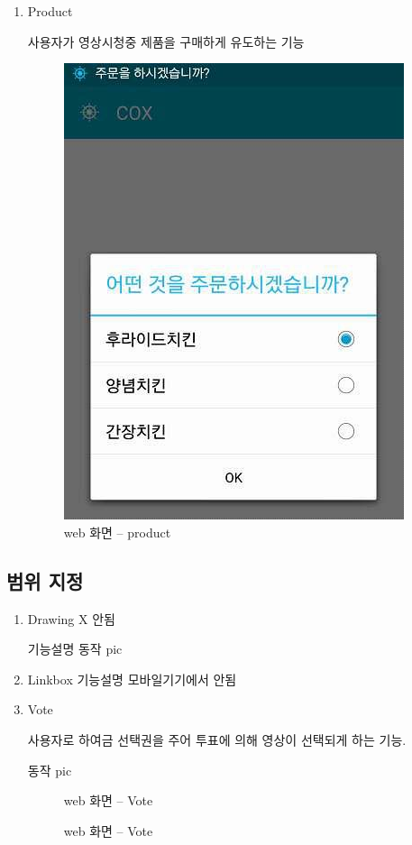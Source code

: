\documentclass[chapter,oneside]{oblivoir}
\begin{document}
\begin{enumerate}
    \item Product

    사용자가 영상시청중 제품을 구매하게 유도하는 기능 

    \begin{figure}[h!]
    \centering
    \includegraphics{pic/chp78/img1123}
    \caption{web 화면 – product}
    \end{figure} 

\end{enumerate}

\subsection{범위 지정}

\begin{enumerate}
    \item Drawing X 안됨

    기능설명
    동작 pic


    \item Linkbox
    기능설명 모바일기기에서 안됨

    \item Vote

    사용자로 하여금 선택권을 주어 투표에 의해 영상이 선택되게 하는 기능.

    동작 pic

    \begin{figure}[h!]
    \centering
    \caption{web 화면 – Vote}
    \end{figure} 


    \begin{figure}[h!]
    \centering
    \caption{web 화면 – Vote}
    \end{figure} 

\end{enumerate}
\end{document}
